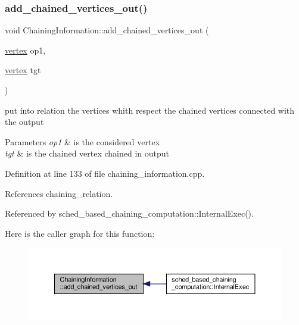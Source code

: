 \subsubsection{\texorpdfstring{add\+\_\+chained\+\_\+vertices\+\_\+out()}{add\_chained\_vertices\_out()}}
{\footnotesize\ttfamily void Chaining\+Information\+::add\+\_\+chained\+\_\+vertices\+\_\+out (\begin{DoxyParamCaption}\item[{\hyperlink{graph_8hpp_abefdcf0544e601805af44eca032cca14}{vertex}}]{op1,  }\item[{\hyperlink{graph_8hpp_abefdcf0544e601805af44eca032cca14}{vertex}}]{tgt }\end{DoxyParamCaption})}



put into relation the vertices whith respect the chained vertices connected with the output 


\begin{DoxyParams}{Parameters}
{\em op1} & is the considered vertex \\
\hline
{\em tgt} & is the chained vertex chained in output \\
\hline
\end{DoxyParams}


Definition at line 133 of file chaining\+\_\+information.\+cpp.



References chaining\+\_\+relation.



Referenced by sched\+\_\+based\+\_\+chaining\+\_\+computation\+::\+Internal\+Exec().

Here is the caller graph for this function\+:
\nopagebreak
\begin{figure}[H]
\begin{center}
\leavevmode
\includegraphics[width=350pt]{d8/d93/classChainingInformation_af5626b18e31136d5d01910be8836bc16_icgraph}
\end{center}
\end{figure}
\mbox{\label{classChainingInformation_af6ba20747c1f89b2c18a28b85e63fb4e}} 

